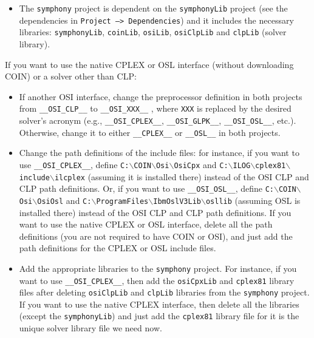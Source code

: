 \begin{itemize}
\begin{itemize}
\item The \texttt{symphony} project is dependent on the \texttt{symphonyLib} 
project (see the dependencies in \texttt{Project --> Dependencies}) 
and it includes the necessary libraries: \texttt{symphonyLib}, 
\texttt{coinLib}, \texttt{osiLib}, \texttt{osiClpLib} and \texttt{clpLib} 
(solver library).

\end{itemize}

If you want to use the native CPLEX or OSL interface 
(without downloading COIN) or a solver other than CLP:

\begin{itemize}

\item If another OSI interface, change the preprocessor
definition in both projects from \texttt{\_\_OSI\_CLP\_\_} to 
\texttt{\_\_OSI\_XXX\_\_} ,
where \texttt{XXX} is replaced by the desired solver's acronym (e.g.,
\texttt{\_\_OSI\_CPLEX\_\_}, \texttt{\_\_OSI\_GLPK\_\_},
\texttt{\_\_OSI\_OSL\_\_}, etc.). Otherwise, change it to either
\texttt{\_\_CPLEX\_\_} or \texttt{\_\_OSL\_\_} in both projects.

\item Change the path definitions of the include files: for instance, if you 
want to use \texttt{\_\_OSI\_CPLEX\_\_}, define
\texttt{C:$\backslash$COIN$\backslash$Osi$\backslash$OsiCpx} and 
\texttt{C:$\backslash$ILOG$\backslash$cplex81$\backslash$include$\backslash$ilcplex} 
(assuming it is installed there) instead of the OSI CLP and CLP path 
definitions. Or, if you want to use \texttt{\_\_OSI\_OSL\_\_}, define 
\texttt{C:$\backslash$COIN$\backslash$Osi$\backslash$OsiOsl} and 
\texttt{C:$\backslash$ProgramFiles$\backslash$IbmOslV3Lib$\backslash$osllib}
(assuming OSL is installed there) instead of the OSI CLP and CLP path 
definitions. If you want to use the native CPLEX or OSL interface, 
delete all the path  definitions (you are not required to have COIN or OSI), 
and just add the path definitions for the CPLEX or OSL include files.

\item Add the appropriate libraries to the \texttt{symphony} project. For
instance, if you want to use \texttt{\_\_OSI\_CPLEX\_\_}, then add the
\texttt{osiCpxLib} and \texttt{cplex81} library files after deleting 
\texttt{osiClpLib} and \texttt{clpLib} libraries from the
\texttt{symphony} project. If you want to use the native CPLEX interface, 
then delete all the libraries (except the \texttt{symphonyLib}) 
and just add the \texttt{cplex81} library file for it is the unique solver 
library file we need now.


\end{itemize}
\end{itemize}
